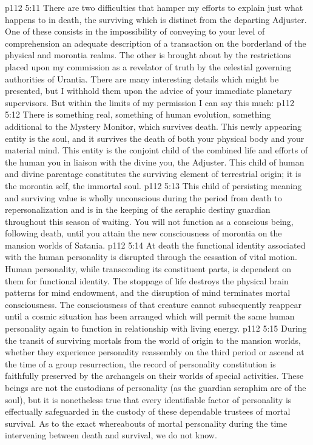 \vs p112 5:11 \pc There are two difficulties that hamper my efforts to explain just what happens to  in death, the surviving  which is distinct from the departing Adjuster. One of these consists in the impossibility of conveying to your level of comprehension an adequate description of a transaction on the borderland of the physical and morontia realms. The other is brought about by the restrictions placed upon my commission as a revelator of truth by the celestial governing authorities of Urantia. There are many interesting details which might be presented, but I withhold them upon the advice of your immediate planetary supervisors. But within the limits of my permission I can say this much:
\vs p112 5:12 There is something real, something of human evolution, something additional to the Mystery Monitor, which survives death. This newly appearing entity is the soul, and it survives the death of both your physical body and your material mind. This entity is the conjoint child of the combined life and efforts of the human you in liaison with the divine you, the Adjuster. This child of human and divine parentage constitutes the surviving element of terrestrial origin; it is the morontia self, the immortal soul.
\vs p112 5:13 This child of persisting meaning and surviving value is wholly unconscious during the period from death to repersonalization and is in the keeping of the seraphic destiny guardian throughout this season of waiting. You will not function as a conscious being, following death, until you attain the new consciousness of morontia on the mansion worlds of Satania.
\vs p112 5:14 At death the functional identity associated with the human personality is disrupted through the cessation of vital motion. Human personality, while transcending its constituent parts, is dependent on them for functional identity. The stoppage of life destroys the physical brain patterns for mind endowment, and the disruption of mind terminates mortal consciousness. The consciousness of that creature cannot subsequently reappear until a cosmic situation has been arranged which will permit the same human personality again to function in relationship with living energy.
\vs p112 5:15 \pc During the transit of surviving mortals from the world of origin to the mansion worlds, whether they experience personality reassembly on the third period or ascend at the time of a group resurrection, the record of personality constitution is faithfully preserved by the archangels on their worlds of special activities. These beings are not the custodians of personality (as the guardian seraphim are of the soul), but it is nonetheless true that every identifiable factor of personality is effectually safeguarded in the custody of these dependable trustees of mortal survival. As to the exact whereabouts of mortal personality during the time intervening between death and survival, we do not know.

